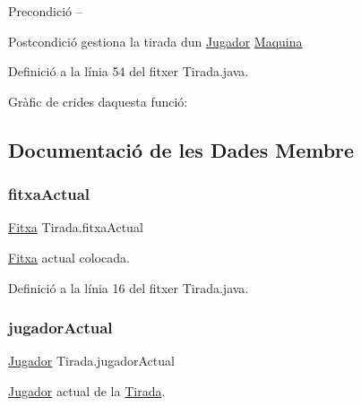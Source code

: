 \begin{DoxyPrecond}{Precondició}
-- 
\end{DoxyPrecond}
\begin{DoxyPostcond}{Postcondició}
gestiona la tirada d\textquotesingle{}un \mbox{\hyperlink{class_jugador}{Jugador}} \mbox{\hyperlink{class_maquina}{Maquina}} 
\end{DoxyPostcond}


Definició a la línia 54 del fitxer Tirada.\+java.

Gràfic de crides d\textquotesingle{}aquesta funció\+:


\subsection{Documentació de les Dades Membre}
\mbox{\label{class_tirada_a22a1439b7888810b998f1f6a30990a36}} 
\subsubsection{\texorpdfstring{fitxa\+Actual}{fitxaActual}}
{\footnotesize\ttfamily \mbox{\hyperlink{class_fitxa}{Fitxa}} Tirada.\+fitxa\+Actual\hspace{0.3cm}{\ttfamily [private]}}



\mbox{\hyperlink{class_fitxa}{Fitxa}} actual colocada. 



Definició a la línia 16 del fitxer Tirada.\+java.

\mbox{\label{class_tirada_a73b6b0d485f45af265828f0d1db8070d}} 
\subsubsection{\texorpdfstring{jugador\+Actual}{jugadorActual}}
{\footnotesize\ttfamily \mbox{\hyperlink{class_jugador}{Jugador}} Tirada.\+jugador\+Actual\hspace{0.3cm}{\ttfamily [private]}}



\mbox{\hyperlink{class_jugador}{Jugador}} actual de la \mbox{\hyperlink{class_tirada}{Tirada}}. 



